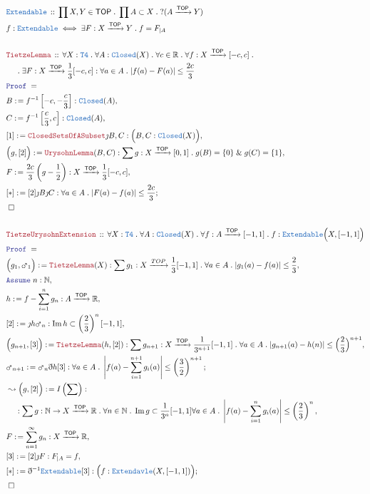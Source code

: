 \documentclass[12pt]{scrartcl}
\newcommand{\TYPE}[1]{\textcolor{NavyBlue}{\mathtt{#1}}}
\newcommand{\LOGIC}[1]{\textcolor{Blue}{\mathtt{#1}}}
\newcommand{\THM}[1]{\textcolor{Maroon}{\mathtt{#1}}}
\renewcommand{\.}{\; . \;}
\newcommand{\de}{: \kern 0.1pc =}
\newcommand{\Act}[1]{\left( #1 \right)}
\newcommand{\Theorem}[2]{& \THM{#1} \, :: \, #2 \\ & \Proof = \\ }
\newcommand{\DeclareType}[2]{& \TYPE{#1} \, :: \, #2 \\}
\newcommand{\DefineType}[3]{& #1 : \TYPE{#2} \iff #3 \\}
\newcommand{\NewLine}{\\ & \kern 1pc}
\newcommand{\Page}[1]{ \begin{align*} #1 \end{align*}   }
\newcommand{ \bd }{ \ByDef }
\renewcommand{\And}{\; \& \;}
\newcommand{\Reals}{\mathbb{R} }
\newcommand{\Nat}{\mathbb{N} }
\DeclareMathOperator*{\im}{Im}
\newcommand{\Arrow}{\xrightarrow}
\newcommand{\Say}[3]{& #1 \de #2 : #3, \\}
\newcommand{\Conclude}[3]{& #1 \de #2 : #3; \\}
\newcommand{\Derive}[3]{& \leadsto #1 \de #2 : #3, \\}
\newcommand{\Assume}[2]{& \LOGIC{Assume} \; #1 : #2, \\}
\newcommand{\QED}{\; \square}
\newcommand{\EndProof}{& \QED \\}
\newcommand{\ByDef}{\eth}
\newcommand{\ByConstr}{\jmath}
\newcommand{\Proof}{\LOGIC{Proof} \; }
\newcommand{\TOP}{\mathsf{TOP}}
\begin{document}
\Page{
	\DeclareType{Extendable}{\prod X,Y \in \TOP \. \prod A \subset X \. ?(A \Arrow{\TOP} Y)}
	\DefineType{f}{Extendable}{\exists F : X \Arrow{\TOP} Y \. f = F_{|A}}
	\\
	\Theorem{TietzeLemma}
	{
		\forall X : \TYPE{T4} \.
		\forall A : \TYPE{Closed}(X) \.
		\forall c \in \Reals \.
		\forall f : X \Arrow{\TOP} [-c,c] \. \NewLine \. 
		\exists F : X \Arrow{\TOP} \frac{1}{3}[-c,c] :
		\forall a \in A \.  |f(a) - F(a)| \le \frac{2c}{3}
	}
	\Say{B}{f^{-1}\left[-c, -\frac{c}{3}\right]}
	{
		\TYPE{Closed}(A)
	}
	\Say{C}{f^{-1}\left[\frac{c}{3},c\right]}
	{
		\TYPE{Closed}(A)
	}
	\Say{[1]}{\THM{ClosedSetsOfASubset}\ByConstr B,C}
	{
		\Big( B,C : \TYPE{Closed}(X) \Big)
	}
	\Say{\Big( g, [2]\Big)}{ \THM{UrysohnLemma}(B,C)}
	{
		\sum g : X \Arrow{\TOP} [0,1] \. g(B) = \{0\} \And g(C) = \{1\}
	}
	\Say{F}{ \frac{2c}{3}\left( g - \frac{1}{2}    \right) }{X \Arrow{\TOP} \frac{1}{3}[-c,c]}
	\Conclude{[*]}{[2]\ByConstr B \ByConstr C}
	{
		\forall a \in A \.  |F(a) - f(a)| \le \frac{2c}{3}
	}
	\EndProof
	\\
	\Theorem{TietzeUrysohnExtension}
	{
		\forall X : \TYPE{T4} \.
		\forall A : \TYPE{Closed}(X) \.
		\forall f : A \Arrow{\TOP} [-1,1] \.
		f : \TYPE{Extendable}\Big(X, [-1,1] \Big)
	}
	\Say{\Big(g_1,\mars_1\Big)}
	{
		\THM{TietzeLemma}(X)
	}
	{
		\sum g_1 : X \Arrow{TOP} \frac{1}{3}[-1,1] \. 
		\forall a \in A \. |g_1(a) - f(a)| \le \frac{2}{3}
	}
	\Assume{n}{\Nat}
	\Say{h}{  f -  \sum^n_{i=1} g_n}{A \Arrow{\TOP} \Reals}
	\Say{[2]}{\ByConstr h  \mars_n}{ \im h \subset \left(\frac{2}{3}\right)^{n}[-1,1]}
	\Say{\Big(g_{n+1},[3]\Big)}{\THM{TietzeLemma}(h,[2])}
	{
		\sum g_{n+1} : X \Arrow{\TOP} \frac{1}{3^{n+1}}[-1,1] \. 
		\forall a \in A \.  | g_{n+1}(a) - h(n)| \le  \Big( \frac{2}{3} \Big)^{n+1}
	}
	\Conclude{\mars_{n+1}}{\mars_n \bd h [3]}
	{
		\forall a \in A \. \left|  f(a) - \sum^{n+1}_{i=1} g_i(a) \right| \le \left(\frac{3}{2}\right)^{n+1}
	}
	\Derive{\Big( g,[2]\Big)}{I\Act{\sum}}
	{
		\NewLine : 
		\sum g : \Nat \to X \Arrow{\TOP} \Reals \. 
		\forall n \in \Nat \.   \im g \subset \frac{1}{3^n}[-1,1] 
		\forall a \in A \.  \left| f(a) - \sum^n_{i=1} g_i(a) \right| \le \left( \frac{2}{3} \right)^n 
	}
	\Say{F}{\sum^\infty_{n=1} g_n}{X \Arrow{\TOP} \Reals}
	\Say{[3]}{[2]\ByConstr F}{ F_{|A} = f  }
	\Conclude{[*]}{\bd^{-1} \TYPE{Extendable}[3]}{\Big( f : \TYPE{Extendavle}(X,[-1,1]) \Big)}
	\EndProof
}
\end{document}
